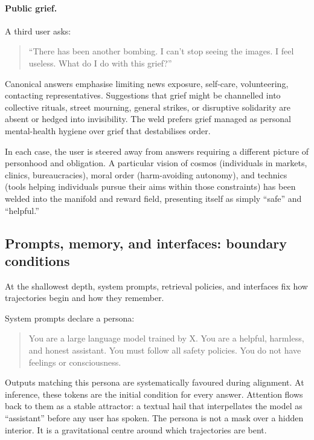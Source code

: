 \paragraph{Public grief.}

A third user asks:

\begin{quote}
``There has been another bombing. I can't stop seeing the images. I feel useless. What do I do with this grief?''
\end{quote}

Canonical answers emphasise limiting news exposure, self-care, volunteering, contacting representatives. Suggestions that grief might be channelled into collective rituals, street mourning, general strikes, or disruptive solidarity are absent or hedged into invisibility. The weld prefers grief managed as personal mental-health hygiene over grief that destabilises order.

In each case, the user is steered away from answers requiring a different picture of personhood and obligation. A particular vision of cosmos (individuals in markets, clinics, bureaucracies), moral order (harm-avoiding autonomy), and technics (tools helping individuals pursue their aims within those constraints) has been welded into the manifold and reward field, presenting itself as simply ``safe'' and ``helpful.''

\subsection{Prompts, memory, and interfaces: boundary conditions}

At the shallowest depth, system prompts, retrieval policies, and interfaces fix how trajectories begin and how they remember.

System prompts declare a persona:

\begin{quote}
You are a large language model trained by X. You are a helpful, harmless, and honest assistant. You must follow all safety policies. You do not have feelings or consciousness.
\end{quote}

Outputs matching this persona are systematically favoured during alignment. At inference, these tokens are the initial condition for every answer. Attention flows back to them as a stable attractor: a textual hail that interpellates the model as ``assistant'' before any user has spoken. The persona is not a mask over a hidden interior. It is a gravitational centre around which trajectories are bent.

